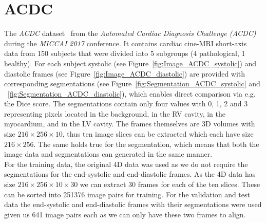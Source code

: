 \documentclass[english,version-2022-01]{uzl-thesis} %
\begin{document}
\section{ACDC}
The \emph{ACDC} dataset~\cite{ACDC} from the \emph{Automated Cardiac Diagnosis Challenge (ACDC)} during the \emph{MICCAI 2017} conference. It contains cardiac cine-MRI short-axis data from 150 subjects that were divided into 5 subgroups (4 pathological, 1 healthy). For each subject systolic (see Figure~\ref{fig:Image_ACDC_systolic}) and diastolic frames (see Figure~\ref{fig:Image_ACDC_diastolic}) are provided with corresponding segmentations (see Figure~\ref{fig:Segmentation_ACDC_systolic} and ~\ref{fig:Segmentation_ACDC_diastolic}), which enables direct comparison via e.g. the Dice score. The segmentations contain only four values with 0, 1, 2 and 3 representing pixels located in the background, in the RV cavity, in the myocardium, and in the LV cavity. The frames themselves are 3D volumes with size $216 \times 256 \times 10$, thus ten image slices can be extracted which each have size $216 \times 256$. The same holds true for the segmentation, which means that both the image data and segmentations can generated in the same manner.\\
For the training data, the original 4D data was used as we do not require the segmentations for the end-systolic and end-diastolic frames. As the 4D data has size $216 \times 256 \times 10 \times 30$ we can extract 30 frames for each of the ten slices. These can be sorted into 251376 image pairs for training. For the validation and test data the end-systolic and end-diastolic frames with their segmentations were used given us 641 image pairs each as we can only have these two frames to align.
\end{document}
